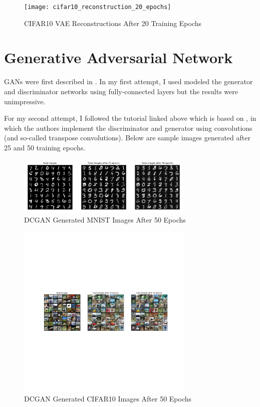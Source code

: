\documentclass[letterpaper, 10pt]{article}
\begin{document}
\begin{figure}[h]
\caption{CIFAR10 VAE Reconstructions After 20 Training Epochs}
\centering
\texttt{[image: cifar10\_reconstruction\_20\_epochs]}
\end{figure}

\section{Generative Adversarial Network}

GANs were first described in \cite{goodfellow2014generative}. 
In my first attempt, I used modeled the generator and discriminator networks using fully-connected layers but the results were unimpressive.

For my second attempt, I followed the tutorial linked above which is based on \cite{radford2015unsupervised},
in which the authors implement the discriminator and generator using convolutions (and so-called transpose convolutions).
Below are sample images generated after 25 and 50 training epochs.

\begin{figure}[h]
\caption{DCGAN Generated MNIST Images After 50 Epochs}
\centering
\includegraphics[width=0.75\textwidth]{mnist_gan_real_v_fake_50_epochs}
\end{figure}

\begin{figure}[h]
\caption{DCGAN Generated CIFAR10 Images After 50 Epochs}
\centering
\includegraphics[width=0.75\textwidth]{cifar10_gan_real_v_fake_50_epochs}
\end{figure}
\end{document}
